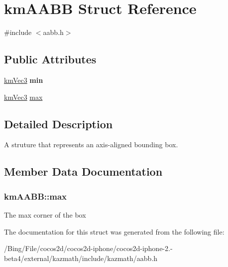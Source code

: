 \hypertarget{structkm_a_a_b_b}{\section{km\-A\-A\-B\-B Struct Reference}
\label{structkm_a_a_b_b}
}


{\ttfamily \#include $<$aabb.\-h$>$}

\subsection*{Public Attributes}
\begin{DoxyCompactItemize}
\item 
\hypertarget{structkm_a_a_b_b_a511f76c686209fd071eb8aed2d52b0ac}{\hyperlink{structkm_vec3}{km\-Vec3} {\bfseries min}}\label{structkm_a_a_b_b_a511f76c686209fd071eb8aed2d52b0ac}

\item 
\hyperlink{structkm_vec3}{km\-Vec3} \hyperlink{structkm_a_a_b_b_ab408e258b39d873882e2b3b335cf88d7}{max}
\end{DoxyCompactItemize}


\subsection{Detailed Description}
A struture that represents an axis-\/aligned bounding box. 

\subsection{Member Data Documentation}
\hypertarget{structkm_a_a_b_b_ab408e258b39d873882e2b3b335cf88d7}{
\subsubsection[{max}]{ {\bf km\-A\-A\-B\-B\-::max}}}\label{structkm_a_a_b_b_ab408e258b39d873882e2b3b335cf88d7}
The max corner of the box 

The documentation for this struct was generated from the following file\-:\begin{DoxyCompactItemize}
\item 
/\-Bing/\-File/cocos2d/cocos2d-\/iphone/cocos2d-\/iphone-\/2.-\/beta4/external/kazmath/include/kazmath/aabb.\-h\end{DoxyCompactItemize}
